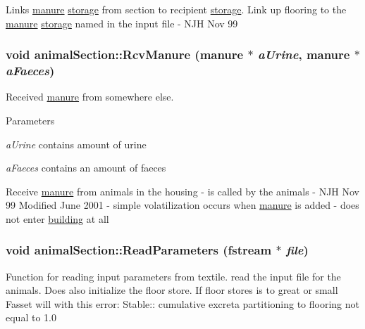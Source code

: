 Links \hyperlink{classmanure}{manure} \hyperlink{classstorage}{storage} from section to recipient \hyperlink{classstorage}{storage}. Link up flooring to the \hyperlink{classmanure}{manure} \hyperlink{classstorage}{storage} named in the input file -\/ NJH Nov 99 \hypertarget{classanimal_section_a37bd72c4e77137793f050339384e9486}{
\subsubsection[{RcvManure}]{\setlength{\rightskip}{0pt plus 5cm}void animalSection::RcvManure ({\bf manure} $\ast$ {\em aUrine}, \/  {\bf manure} $\ast$ {\em aFaeces})}}
\label{classanimal_section_a37bd72c4e77137793f050339384e9486}


Received \hyperlink{classmanure}{manure} from somewhere else. 
\begin{DoxyParams}{Parameters}
\item[{\em aUrine}]contains amount of urine \item[{\em aFaeces}]contains an amount of faeces\end{DoxyParams}
Receive \hyperlink{classmanure}{manure} from animals in the housing -\/ is called by the animals -\/ NJH Nov 99 Modified June 2001 -\/ simple volatilization occurs when \hyperlink{classmanure}{manure} is added -\/ does not enter \hyperlink{classbuilding}{building} at all \hypertarget{classanimal_section_afe24791a22d2cbdb189332e1b468f059}{
\subsubsection[{ReadParameters}]{\setlength{\rightskip}{0pt plus 5cm}void animalSection::ReadParameters (fstream $\ast$ {\em file})}}
\label{classanimal_section_afe24791a22d2cbdb189332e1b468f059}


Function for reading input parameters from textile. read the input file for the animals. Does also initialize the floor store. If floor stores is to great or small Fasset will with this error: Stable:: cumulative excreta partitioning to flooring not equal to 1.0 

